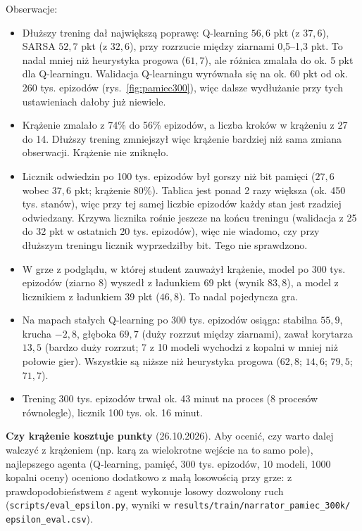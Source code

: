 \documentclass[11pt,a4paper]{article}
\begin{document}
Obserwacje:
\begin{itemize}
  \item Dłuższy trening dał największą poprawę: Q-learning $56{,}6$ pkt (z $37{,}6$),
  SARSA $52{,}7$ pkt (z $32{,}6$), przy rozrzucie między ziarnami 0,5--1,3 pkt. To nadal
  mniej niż heurystyka progowa ($61{,}7$), ale różnica zmalała do ok. 5 pkt dla
  Q-learningu. Walidacja Q-learningu wyrównała się na ok. 60 pkt od ok. 260 tys.
  epizodów (rys.~\ref{fig:pamiec300}), więc dalsze wydłużanie przy tych ustawieniach
  dałoby już niewiele.
  \item Krążenie zmalało z 74\% do 56\% epizodów, a liczba kroków w krążeniu z 27 do 14.
  Dłuższy trening zmniejszył więc krążenie bardziej niż sama zmiana obserwacji.
  Krążenie nie zniknęło.
  \item Licznik odwiedzin po 100 tys. epizodów był gorszy niż bit pamięci ($27{,}6$
  wobec $37{,}6$ pkt; krążenie 80\%). Tablica jest ponad 2 razy większa (ok. 450 tys.
  stanów), więc przy tej samej liczbie epizodów każdy stan jest rzadziej odwiedzany.
  Krzywa licznika rośnie jeszcze na końcu treningu (walidacja z 25 do 32 pkt w ostatnich
  20 tys. epizodów), więc nie wiadomo, czy przy dłuższym treningu licznik wyprzedziłby
  bit. Tego nie sprawdzono.
  \item W grze z podglądu, w której student zauważył krążenie, model po 300 tys.
  epizodów (ziarno 8) wyszedł z ładunkiem 69 pkt (wynik $83{,}8$), a model z licznikiem
  z ładunkiem 39 pkt ($46{,}8$). To nadal pojedyncza gra.
  \item Na mapach stałych Q-learning po 300 tys. epizodów osiąga: stabilna $55{,}9$,
  krucha $-2{,}8$, głęboka $69{,}7$ (duży rozrzut między ziarnami), zawał korytarza
  $13{,}5$ (bardzo duży rozrzut; 7 z 10 modeli wychodzi z kopalni w mniej niż połowie gier).
  Wszystkie są niższe niż heurystyka progowa ($62{,}8$; $14{,}6$; $79{,}5$; $71{,}7$).
  \item Trening 300 tys. epizodów trwał ok. 43 minut na proces (8 procesów
  równolegle), licznik 100 tys. ok. 16 minut.
\end{itemize}

\textbf{Czy krążenie kosztuje punkty} (26.10.2026). Aby ocenić, czy warto dalej
walczyć z krążeniem (np. karą za wielokrotne wejście na to samo pole), najlepszego
agenta (Q-learning, pamięć, 300 tys. epizodów, 10 modeli, 1000 kopalni oceny) oceniono
dodatkowo z małą losowością przy grze: z prawdopodobieństwem $\varepsilon$ agent
wykonuje losowy dozwolony ruch (\texttt{scripts/\allowbreak eval\_epsilon.py}, wyniki
w \texttt{results/\allowbreak train/\allowbreak narrator\_pamiec\_300k/\allowbreak
epsilon\_eval.csv}).
\end{document}
